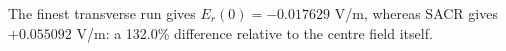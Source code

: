 The finest transverse run gives $E_r(0)=-0.017629$ V/m, whereas SACR gives $+0.055092$ V/m: a 132.0\% difference relative to the centre field itself. 
